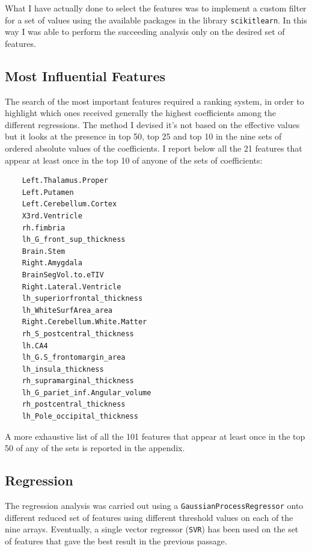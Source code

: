 \documentclass[11pt,a4paper]{report}
\begin{document}
What I have actually done to select the features was to implement a custom filter for a set of values using the available packages in the library \texttt{scikitlearn}. In this way I was able to perform the succeeding analysis only on the desired set of features.

\subsection*{Most Influential Features}
The search of the most important features required a ranking system, in order to highlight which ones received generally the highest coefficients among the different regressions. The method I devised it's not based on the effective values but it looks at the presence in top 50, top 25 and top 10 in the nine sets of ordered absolute values of the coefficients. I report below all the 21 features that appear at least once in the top 10 of anyone of the sets of coefficients:

\begin{multicols}{2}
  \begin{verbatim}
    Left.Thalamus.Proper
    Left.Putamen
    Left.Cerebellum.Cortex
    X3rd.Ventricle
    rh.fimbria
    lh_G_front_sup_thickness
    Brain.Stem
    Right.Amygdala
    BrainSegVol.to.eTIV
    Right.Lateral.Ventricle
    lh_superiorfrontal_thickness
    lh_WhiteSurfArea_area
    Right.Cerebellum.White.Matter
    rh_S_postcentral_thickness
    lh.CA4
    lh_G.S_frontomargin_area
    lh_insula_thickness
    rh_supramarginal_thickness
    lh_G_pariet_inf.Angular_volume
    rh_postcentral_thickness
    lh_Pole_occipital_thickness
\end{verbatim}
\end{multicols}

A more exhaustive list of all the 101 features that appear at least once in the top 50 of any of the sets is reported in the appendix.

\subsection*{Regression}
The regression analysis was carried out using a \texttt{GaussianProcessRegressor} onto different reduced set of features using different threshold values on each of the nine arrays. Eventually, a single vector regressor (\texttt{SVR}) has been used on the set of features that gave the best result in the previous passage.
\end{document}
